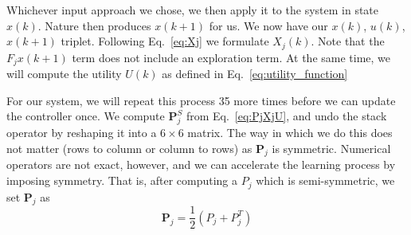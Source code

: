 Whichever input approach we chose, we then apply it to the system in state $x\left(k\right)$. Nature then produces $x\left(k+1\right)$ for us. We now have our $x\left(k\right)$, $u\left(k\right)$, $x\left(k+1\right)$ triplet. Following Eq.~\ref{eq:Xj} we formulate $X_j\left(k\right)$. Note that the $F_j x\left(k+1\right)$ term does not include an exploration term. At the same time, we will compute the utility $U\left(k\right)$ as defined in Eq.~\ref{eq:utility_function}

For our system, we will repeat this process 35 more times before we can update the controller once. We compute $\textbf{P}_j^S$ from Eq.~\ref{eq:PjXjU}, and undo the stack operator by reshaping it into a $6 \times 6$ matrix. The way in which we do this does not matter (rows to column or column to rows) as $\textbf{P}_j$ is symmetric. Numerical operators are not exact, however, and we can accelerate the learning process by imposing symmetry. That is, after computing a $P_j$ which is semi-symmetric, we set $\textbf{P}_j$ as
\begin{equation}
    \textbf{P}_j=\frac{1}{2}\left(P_j+P_j^T\right)
\end{equation}

